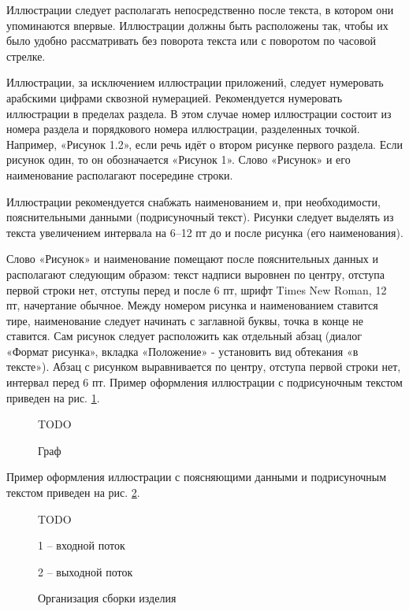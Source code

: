 Иллюстрации следует располагать непосредственно после текста, в котором они
упоминаются впервые. Иллюстрации должны быть расположены так, чтобы их было удобно
рассматривать без поворота текста или с поворотом по часовой стрелке.

Иллюстрации, за исключением иллюстрации приложений, следует нумеровать арабскими цифрами 
сквозной нумерацией. Рекомендуется нумеровать иллюстрации в пределах раздела. В этом случае
номер иллюстрации состоит из номера раздела и порядкового номера
иллюстрации, разделенных точкой. Например, «Рисунок 1.2», если речь идёт о втором рисунке
первого раздела. Если рисунок один, то он обозначается «Рисунок 1». Слово «Рисунок» и его
наименование располагают посередине строки.

Иллюстрации рекомендуется снабжать наименованием и, при необходимости,
пояснительными данными (подрисуночный текст). Рисунки следует выделять из текста
увеличением интервала на 6–12 пт до и после рисунка (его наименования).

Слово «Рисунок» и наименование помещают после пояснительных данных и
располагают следующим образом: текст надписи выровнен по центру, отступа первой строки
нет, отступы перед и после 6 пт, шрифт Times New Roman, 12 пт, начертание обычное. Между
номером рисунка и наименованием ставится тире, наименование следует начинать с заглавной
буквы, точка в конце не ставится. Сам рисунок следует расположить как отдельный абзац
(диалог «Формат рисунка», вкладка «Положение» - установить вид обтекания «в тексте»). Абзац
с рисунком выравнивается по центру, отступа первой строки нет, интервал перед 6 пт.
Пример оформления иллюстрации с подрисуночным текстом приведен на рис. \ref{figsample}.

\begin{figure}[h]
	\begin{framed}
		\centerline{TODO}
	\end{framed}
	\caption{Граф}
	\label{figsample}
\end{figure}

Пример оформления иллюстрации с поясняющими данными и подрисуночным текстом
приведен на рис. \ref{figsample2}.

\begin{figure}[h]
	\begin{framed}
		\centerline{TODO}
	\end{framed}
	\centerline{1 -- входной поток}
	\centerline{2 -- выходной поток}
	\caption{Организация сборки изделия}
	\label{figsample2}
\end{figure}

